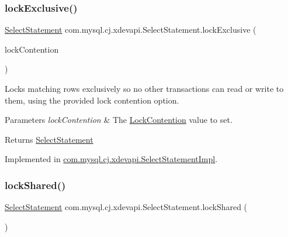 \subsubsection{\texorpdfstring{lock\+Exclusive()}{lockExclusive()}\hspace{0.1cm}{\footnotesize\ttfamily [2/2]}}
{\footnotesize\ttfamily \mbox{\hyperlink{interfacecom_1_1mysql_1_1cj_1_1xdevapi_1_1_select_statement}{Select\+Statement}} com.\+mysql.\+cj.\+xdevapi.\+Select\+Statement.\+lock\+Exclusive (\begin{DoxyParamCaption}\item[{Lock\+Contention}]{lock\+Contention }\end{DoxyParamCaption})}

Locks matching rows exclusively so no other transactions can read or write to them, using the provided lock contention option.


\begin{DoxyParams}{Parameters}
{\em lock\+Contention} & The \mbox{\hyperlink{}{Lock\+Contention}} value to set. \\
\hline
\end{DoxyParams}
\begin{DoxyReturn}{Returns}
\mbox{\hyperlink{interfacecom_1_1mysql_1_1cj_1_1xdevapi_1_1_select_statement}{Select\+Statement}} 
\end{DoxyReturn}


Implemented in \mbox{\hyperlink{classcom_1_1mysql_1_1cj_1_1xdevapi_1_1_select_statement_impl_afbaa870747c558133a85fcc536658503}{com.\+mysql.\+cj.\+xdevapi.\+Select\+Statement\+Impl}}.

\mbox{\label{interfacecom_1_1mysql_1_1cj_1_1xdevapi_1_1_select_statement_aeee3b8b28d07cd0609e01164fda0bfd3}} 
\subsubsection{\texorpdfstring{lock\+Shared()}{lockShared()}\hspace{0.1cm}{\footnotesize\ttfamily [1/2]}}
{\footnotesize\ttfamily \mbox{\hyperlink{interfacecom_1_1mysql_1_1cj_1_1xdevapi_1_1_select_statement}{Select\+Statement}} com.\+mysql.\+cj.\+xdevapi.\+Select\+Statement.\+lock\+Shared (\begin{DoxyParamCaption}{ }\end{DoxyParamCaption})}

